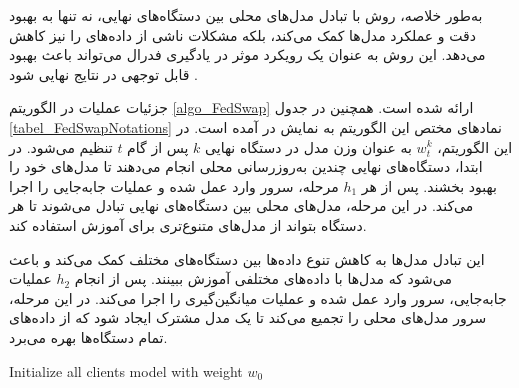 به‌طور خلاصه، روش
با تبادل مدل‌های محلی بین دستگاه‌های نهایی، نه تنها به بهبود دقت و عملکرد مدل‌ها کمک می‌کند، بلکه مشکلات ناشی از داده‌های
را نیز کاهش می‌دهد. این روش به عنوان یک رویکرد موثر در یادگیری فدرال می‌تواند باعث بهبود قابل توجهی در نتایج نهایی شود
\cite{chiu2020semisupervised}.


جزئیات عملیات
در الگوریتم
\ref{algo_FedSwap}
ارائه شده است.
همچنین در جدول
\ref{tabel_FedSwapNotations}
نمادهای مختص این الگوریتم به نمایش در آمده است.
در این الگوریتم،
$w^k_t$
به عنوان وزن مدل در دستگاه نهایی
$k$
پس از گام
$t$
تنظیم می‌شود. در ابتدا، دستگاه‌های نهایی چندین به‌روزرسانی محلی انجام می‌دهند تا مدل‌های خود را بهبود بخشند. پس از هر
$h_1$
مرحله، سرور وارد عمل شده و عملیات جابه‌جایی را اجرا می‌کند. در این مرحله، مدل‌های محلی بین دستگاه‌های نهایی تبادل می‌شوند تا هر دستگاه بتواند از مدل‌های متنوع‌تری برای آموزش استفاده کند.

این تبادل مدل‌ها به کاهش تنوع داده‌ها بین دستگاه‌های مختلف کمک می‌کند و باعث می‌شود که مدل‌ها با داده‌های مختلفی آموزش ببینند. پس از انجام
$h_2$
عملیات جابه‌جایی، سرور وارد عمل شده و عملیات میانگین‌گیری را اجرا می‌کند. در این مرحله، سرور مدل‌های محلی را تجمیع می‌کند تا یک مدل مشترک ایجاد شود که از داده‌های تمام دستگاه‌ها بهره‌ می‌برد.


\begin{LTR}
	\begin{algorithm}[t]
		\begin{RTL}
			\caption{%
				جابه‌جایی فدرال
				\cite{chiu2020semisupervised}
			}
			\label{algo_FedSwap}
		\end{RTL}
		
		\begin{latin}
			Initialize all clients model with weight $w_0$\;
		\end{latin}
	\end{algorithm}
\end{LTR}


